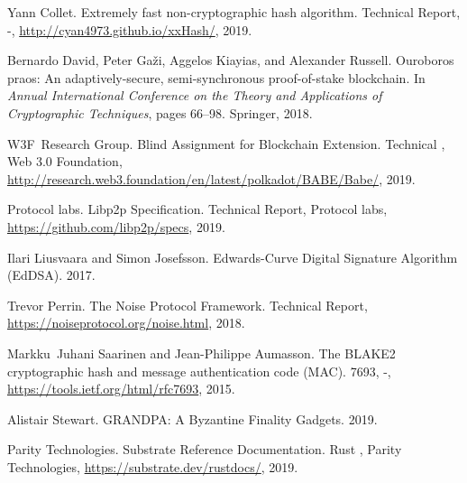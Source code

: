 \documentclass{book}
\newcommand{\tmtextit}[1]{{\itshape{#1}}}
\providecommand{\tmtextit}[1]{\tmtextit{#1}}
\begin{document}
\begin{thebibliography}{DGKR18}
  Yann Collet. {\newblock}Extremely fast
  non-cryptographic hash algorithm. {\newblock}Technical Report, -,
  \url{http://cyan4973.github.io/xxHash/}, 2019.{\newblock}
  
  Bernardo David, Peter Ga{\v z}i,
  Aggelos Kiayias, and  Alexander Russell. {\newblock}Ouroboros praos: An
  adaptively-secure, semi-synchronous proof-of-stake blockchain. {\newblock}In
  \tmtextit{Annual International Conference on the Theory and Applications of
  Cryptographic Techniques},  pages  66--98. Springer, 2018.{\newblock}
  
  W3F~Research Group.
  {\newblock}Blind Assignment for Blockchain Extension. {\newblock}Technical
  {}, Web 3.0 Foundation,
  \url{http://research.web3.foundation/en/latest/polkadot/BABE/Babe/},
  2019.{\newblock}
  
  Protocol labs. {\newblock}Libp2p
  Specification. {\newblock}Technical Report, Protocol labs,
  \url{https://github.com/libp2p/specs}, 2019.{\newblock}
  
  Ilari Liusvaara  and  Simon
  Josefsson. {\newblock}Edwards-Curve Digital Signature Algorithm (EdDSA).
  {\newblock}2017.{\newblock}
  
  Trevor Perrin. {\newblock}The Noise
  Protocol Framework. {\newblock}Technical Report,
  \url{https://noiseprotocol.org/noise.html}, 2018.{\newblock}
  
  Markku~Juhani Saarinen  and 
  Jean-Philippe Aumasson. {\newblock}The BLAKE2 cryptographic hash and message
  authentication code (MAC). {\newblock}{} 7693, -,
  \url{https://tools.ietf.org/html/rfc7693}, 2015.{\newblock}
  
  Alistair Stewart. {\newblock}GRANDPA:
  A Byzantine Finality Gadgets. {\newblock}2019.{\newblock}
  
  Parity Technologies.
  {\newblock}Substrate Reference Documentation. {\newblock}Rust
  {}, Parity Technologies,
  \url{https://substrate.dev/rustdocs/}, 2019.{\newblock}
\end{thebibliography}

\printindex
\end{document}
